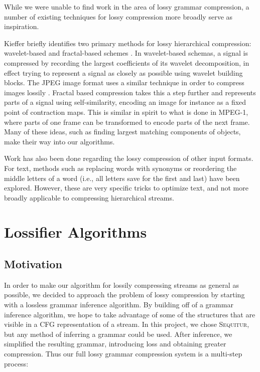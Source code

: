 \documentclass[11pt]{article}
\newcommand{\Sequitur}{\textsc{Sequitur}\xspace}
\begin{document}
While we were unable to find work in the area of lossy grammar compression, a
number of existing techniques for lossy compression more broadly serve as
inspiration.

Kieffer briefly identifies two primary methods for lossy hierarchical
compression: wavelet-based and fractal-based schemes \cite{tutorial}.  In
wavelet-based schemas, a signal is compressed by recording the largest
coefficients of its wavelet decomposition, in effect trying to represent a
signal as closely as possible using wavelet building blocks.  The JPEG image
format uses a similar technique in order to compress images lossily
\cite{jpeg}.  Fractal based compression takes this a step further and
represents parts of a signal using self-similarity, encoding an image for
instance as a fixed point of contraction maps.  This is similar in spirit to
what is done in MPEG-1, where parts of one frame can be transformed to encode
parts of the next frame. Many of these ideas, such as finding largest matching
components of objects, make their way into our algorithms.

Work has also been done regarding the lossy compression of other input formats.
For text, methods such as replacing words with synonyms \cite{semanticlossy} or
reordering the middle letters of a word (i.e., all letters save for the first
and last) \cite{semilossless} have been explored.  However, these are very
specific tricks to optimize text, and not more broadly applicable to
compressing hierarchical streams.

\section{Lossifier Algorithms}

\subsection{Motivation}

In order to make our algorithm for lossily compressing streams as general as
possible, we decided to approach the problem of lossy compression by starting
with a lossless grammar inference algorithm.  By building off of a grammar
inference algorithm, we hope to take advantage of some of the structures that
are visible in a CFG representation of a stream.  In this project, we chose
\Sequitur, but any method of inferring a grammar could be used.  After
inference, we simplified the resulting grammar, introducing loss and obtaining
greater compression.  Thus our full lossy grammar compression system is a
multi-step process:
\end{document}
